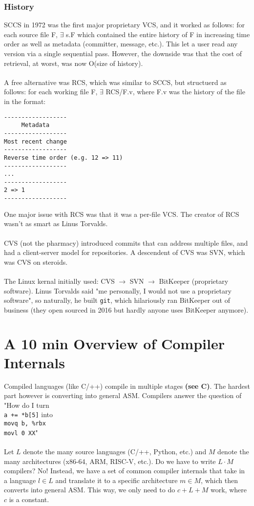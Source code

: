\documentclass[13pt]{article}
\begin{document}
\subsubsection{History}
SCCS in 1972 was the first major proprietary VCS, and it worked as follows: for each source file F, $\exists$ s.F which contained the entire history of F in increasing time order as well as metadata (committer, message, etc.). This let a user read any version via a single sequential pass. However, the downside was that the cost of retrieval, at worst, was now O(size of history). \\ \\
A free alternative was RCS, which was similar to SCCS, but structuerd as follows: for each working file F, $\exists$ RCS/F.v, where F.v was the history of the file in the format:
\begin{verbatim}
------------------
     Metadata
------------------
Most recent change
------------------
Reverse time order (e.g. 12 => 11)
------------------
...
------------------
2 => 1
------------------
\end{verbatim}
One major issue with RCS was that it was a per-file VCS. The creator of RCS wasn't as smart as Linus Torvalds. \\ \\
CVS (not the pharmacy) introduced commits that can address multiple files, and had a client-server model for repositories. A descendent of CVS was SVN, which was CVS on steroids. \\ \\
The Linux kernal initially used: CVS $\rightarrow$ SVN $\rightarrow$ BitKeeper (proprietary software). Linus Torvalds said "me personally, I would not use a proprietary software", so naturally, he built \texttt{git}, which hilariously ran BitKeeper out of business (they open sourced in 2016 but hardly anyone uses BitKeeper anymore).





\section{A 10 min Overview of Compiler Internals}
Compiled languages (like C/++) compile in multiple stages \textbf{(see C)}. The hardest part however is converting into general ASM. Compilers answer the question of "How do I turn \\ \texttt{a += *b[5]} into \\ \texttt{movq b, \%rbx \\movl 0 XX}" \\ \\
Let $L$ denote the many source languages (C/++, Python, etc.) and $M$ denote the many architectures (x86-64, ARM, RISC-V, etc.). Do we have to write $L \cdot M$ compilers? No! Instead, we have a set of common compiler internals that take in a language $l \in L$ and translate it to a specific architecture $m \in M$, which then converts into general ASM. This way, we only need to do $c + L + M$ work, where $c$ is a constant.
\end{document}
